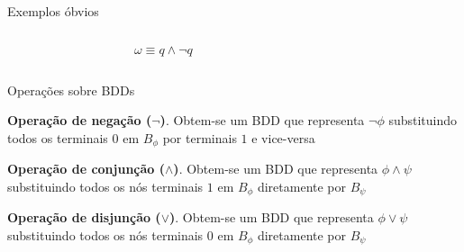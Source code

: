 \expandafter\documentclass\expandafter[table, usenames, svgnames, dvipsnames,14pt, \classopts]{beamer}
\begin{document}
\begin{frame}{Exemplos óbvios}
\begin{columns}[c]
\begin{figure}
\begin{tikzpicture}
                \end{tikzpicture}

            \end{figure}

            \begin{figure}

                \caption{$\omega \equiv q \land \lnot{q}$}
            

            \end{figure}
        
    \end{columns}

\end{frame}

\begin{frame}{Operações sobre \uppercase{BDD}s}

    \begin{outline}
        \small
        \1 \textbf{Operação de negação ($\lnot$)}. Obtem-se um BDD que representa $\lnot{\phi}$ substituindo todos os terminais $0$ em $B_\phi$ por terminais $1$ e vice-versa
        
        \vspace{1em}
        
        \1 \textbf{Operação de conjunção ($\land$)}. Obtem-se um BDD que representa $\phi \land \psi$ substituindo todos os nós terminais $1$ em $B_\phi$ diretamente por $B_\psi$
        
        \vspace{1em}
        
        \1 \textbf{Operação de disjunção ($\lor$)}. Obtem-se um BDD que representa $\phi \lor \psi$ substituindo todos os nós terminais $0$ em $B_\phi$ diretamente por $B_\psi$
    \end{outline}

\end{frame}
\end{document}
